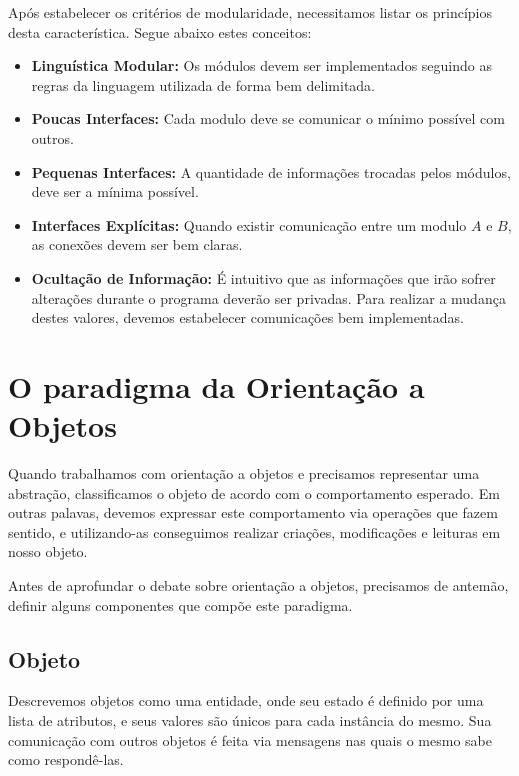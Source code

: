 \documentclass[a4paper, 12pt]{article}
\begin{document}
		Após estabelecer os critérios de modularidade, necessitamos listar os princípios desta característica. Segue abaixo estes conceitos:
		
		\begin{itemize}
			\item \textbf{Linguística Modular:} Os módulos devem ser implementados seguindo as regras da linguagem utilizada de forma bem delimitada.
			
			\item \textbf{Poucas Interfaces:} Cada modulo deve se comunicar o mínimo possível com outros.
			
			\item \textbf{Pequenas Interfaces:} A quantidade de informações trocadas pelos módulos, deve ser a mínima possível.
			
			\item \textbf{Interfaces Explícitas:} Quando existir comunicação entre um modulo $A$ e $B$, as conexões devem ser bem claras.
			
			\item \textbf{Ocultação de Informação:} É intuitivo que as informações que irão sofrer alterações durante o programa deverão ser privadas. Para realizar a mudança destes valores, devemos estabelecer comunicações bem implementadas.
		\end{itemize}
	
	\section{O paradigma da Orientação a Objetos}
		
		Quando trabalhamos com orientação a objetos e precisamos representar uma abstração, classificamos o objeto de acordo com o comportamento esperado. Em outras palavas, devemos expressar este comportamento via operações que fazem sentido, e utilizando-as conseguimos realizar criações, modificações e leituras em nosso objeto.
		
		Antes de aprofundar o debate sobre orientação a objetos, precisamos de antemão, definir alguns componentes que compõe este paradigma.
		
		\subsection{Objeto}
		
		Descrevemos objetos como uma entidade, onde seu estado é definido por uma lista de atributos, e seus valores são únicos para cada instância do mesmo. Sua comunicação com outros objetos é feita via mensagens nas quais o mesmo sabe como respondê-las.
		
\end{document}
